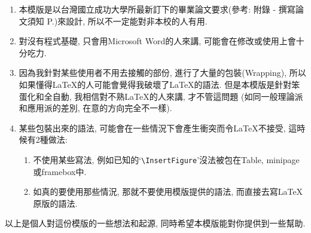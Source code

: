 \begin{enumerate}

  \item
  {
    本模版是以台灣國立成功大學所最新訂下的畢業論文要求(參考: 附錄 - 撰寫論文須知 P.)來設計, 所以不一定能對非本校的人有用.
  } %

  \item
  {
    對沒有程式基礎, 只會用Microsoft Word的人來講, 可能會在修改或使用上會十分吃力.
  } %

  \item
  {
    因為我針對某些使用者不用去接觸的部份, 進行了大量的包裝(Wrapping), 所以如果懂得LaTeX的人可能會覺得我破壞了LaTeX的語法. 但是本模版是針對笨蛋化和全自動, 我相信對不熟LaTeX的人來講, 才不管這問題 (如同一般理論派和應用派的差別, 在意的方向完全不一樣).
  } %

  \item
  {
    某些包裝出來的語法, 可能會在一些情況下會產生衝突而令LaTeX不接受, 這時候有2種做法:
    \begin{enumerate}
      \item
      {
        不使用某些寫法, 例如已知的`\verb|\InsertFigure|'沒法被包在Table, minipage或framebox中.
      } %

      \item
      {
        如真的要使用那些情況, 那就不要使用模版提供的語法, 而直接去寫LaTeX原版的語法.
      } %
    \end{enumerate}
  } %
\end{enumerate}



以上是個人對這份模版的一些想法和起源, 同時希望本模版能對你提供到一些幫助.

\EndChapter
